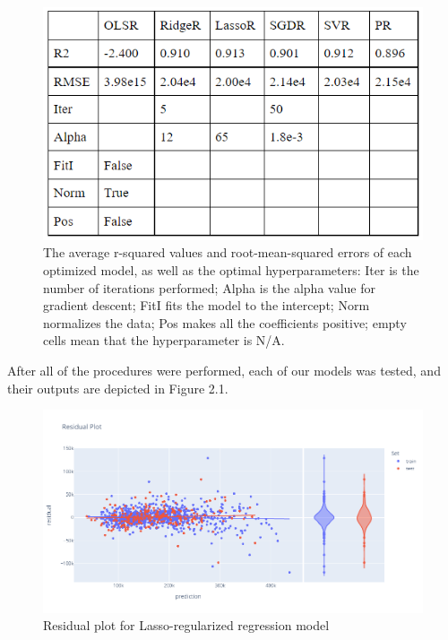 \documentclass[12pt]{article}
\begin{document}
\begin{figure}[H]
\centering
\renewcommand{\thefigure}{2.1}
\includegraphics{2.1.png}
\caption{The average r-squared values and root-mean-squared errors of each optimized model, as well as the optimal hyperparameters: Iter is the number of iterations performed; Alpha is the alpha value for gradient descent; FitI fits the model to the intercept; Norm normalizes the data; Pos makes all the coefficients positive; empty cells mean that the hyperparameter is N/A.}
\end{figure}

\par \qquad After all of the procedures were performed, each of our models was tested, and their outputs are depicted in Figure 2.1.

\begin{figure}[H]
\centering
\renewcommand{\thefigure}{2.2}
\includegraphics[width=\textwidth,height=\textheight,keepaspectratio]{2.2.png}
\caption{Residual plot for Lasso-regularized regression model}
\end{figure}
\end{document}
